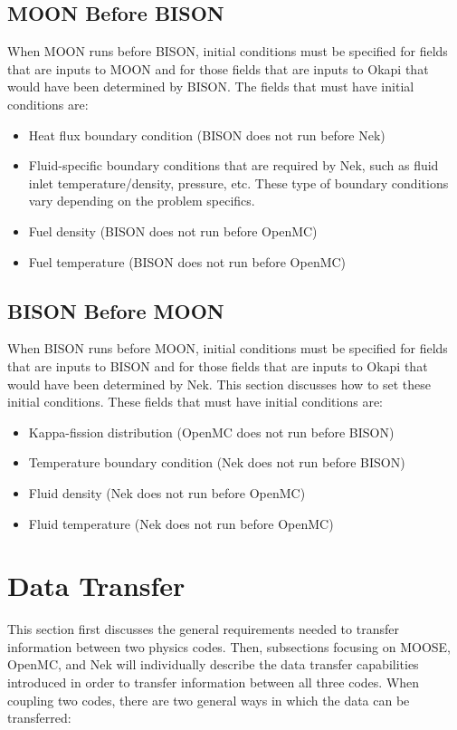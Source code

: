 \documentclass[10pt]{article}
\numberwithin{equation}{section} %
\begin{document}
\subsection{MOON Before BISON}
When MOON runs before BISON, initial conditions must be specified for fields that are inputs to MOON and for those fields that are inputs to Okapi that would have been determined by BISON. The fields that must have initial conditions are:

\begin{itemize}
\item Heat flux boundary condition (BISON does not run before Nek)
\item Fluid-specific boundary conditions that are required by Nek, such as fluid inlet temperature/density, pressure, etc. These type of boundary conditions vary depending on the problem specifics.
\item Fuel density (BISON does not run before OpenMC)
\item Fuel temperature (BISON does not run before OpenMC)
\end{itemize}

\subsection{BISON Before MOON}
When BISON runs before MOON, initial conditions must be specified for fields that are inputs to BISON and for those fields that are inputs to Okapi that would have been determined by Nek. This section discusses how to set these initial conditions. These fields that must have initial conditions are:

\begin{itemize}
\item Kappa-fission distribution (OpenMC does not run before BISON)
\item Temperature boundary condition (Nek does not run before BISON)
\item Fluid density (Nek does not run before OpenMC)
\item Fluid temperature (Nek does not run before OpenMC)
\end{itemize}

\clearpage
\section{Data Transfer}
This section first discusses the general requirements needed to transfer information between two physics codes. Then, subsections focusing on MOOSE, OpenMC, and Nek will individually describe the data transfer capabilities introduced in order to transfer information between all three codes. When coupling two codes, there are two general ways in which the data can be transferred:
\end{document}
